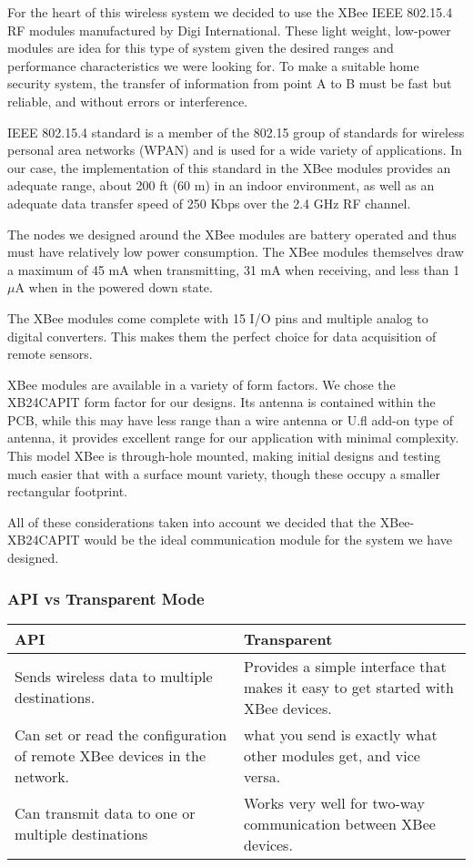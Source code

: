\par For the heart of this wireless system we decided to use the XBee IEEE 802.15.4 RF modules manufactured by Digi International. These light weight, low-power modules are idea for this type of system given the desired ranges and performance characteristics we were looking for. To make a suitable home security system, the transfer of information from point A to B must be fast but reliable, and without errors or interference.
 \par IEEE 802.15.4 standard is a member of the 802.15 group of standards for wireless personal area networks (WPAN) and is used for a wide variety of applications. In our case, the implementation of this standard in the XBee modules provides an adequate range, about 200 ft (60 m) in an indoor environment, as well as an adequate data transfer speed of 250 Kbps over the 2.4 GHz RF channel.     
\par The nodes we designed around the XBee modules are battery operated and thus must have relatively low power consumption. The XBee modules themselves draw a maximum of 45 mA when transmitting, 31 mA when receiving, and less than 1 $\mu$A when in the powered down state. 
\par The XBee modules come complete with 15 I/O pins and multiple analog to digital converters. This makes them the perfect choice for data acquisition of remote sensors. 
\par XBee modules are available in a variety of form factors. We chose the XB24CAPIT form factor for our designs. Its antenna is contained within the PCB, while this may have less range than a wire antenna or U.fl add-on type of antenna, it provides excellent range for our application with minimal complexity. This model XBee is through-hole mounted, making initial designs and testing much easier that with a surface mount variety, though these occupy a smaller rectangular footprint. 
\par All of these considerations taken into account we decided that the XBee-XB24CAPIT would be the ideal communication module for the system we have designed. \\

\subsubsection{API vs Transparent Mode}
\begin{table}[h]\cite{Digi}
	\begin{tabular}[width=0.5\linewidth]{p{0.5\linewidth}p{0.5\linewidth}}
		API & Transparent \\
		\hline
			 Sends wireless data to multiple destinations. &Provides a simple interface that makes it easy to get started with XBee devices. \\
			Can set or read the configuration of remote XBee devices in the network.&what you send is exactly what other modules get, and vice versa.\\
			Can transmit data to one or multiple destinations&Works very well for two-way communication between XBee devices.
	\end{tabular}
\end{table}